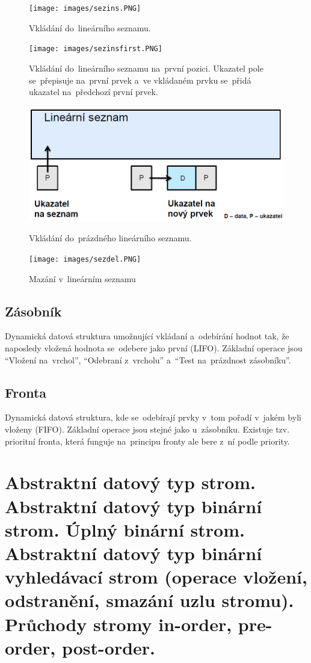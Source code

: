 \begin{figure}[ht]
	\centering
	\texttt{[image: images/sezins.PNG]}
	\caption{Vkládání do~lineárního seznamu.}
	\label{sezins}
	
	\texttt{[image: images/sezinsfirst.PNG]}
	\caption{Vkládání do~lineárního seznamu na~první pozici. Ukazatel pole se~přepisuje na~první prvek a~ve vkládaném prvku se~přidá ukazatel na~předchozí první prvek.}

	\includegraphics[scale=0.5]{images/sezinsempty.PNG}
	\caption{Vkládání do~prázdného lineárního seznamu.}

	\texttt{[image: images/sezdel.PNG]}
	\caption{Mazání v~lineárním seznamu}
\end{figure}

\subsection{Zásobník}

Dynamická datová struktura umožnující vkládaní a~odebírání hodnot tak, že naposledy vložená hodnota se~odebere jako první (LIFO). Základní operace jsou \enquote{Vložení na~vrchol}, \enquote{Odebraní z~vrcholu} a~\enquote{Test na~prázdnost zásobníku}.

\subsection{Fronta}

Dynamická datová struktura, kde se~odebírají prvky v~tom pořadí v~jakém byli vloženy (FIFO). Základní operace jsou stejné jako u~zásobníku. Existuje tzv. prioritní fronta, která funguje na~principu fronty ale bere z~ní podle priority.

\clearpage
\section{Abstraktní datový typ strom. Abstraktní datový typ binární strom. Úplný binární strom. Abstraktní datový typ binární vyhledávací strom (operace vložení, odstranění, smazání uzlu stromu). Průchody stromy in-order, pre-order, post-order.}

